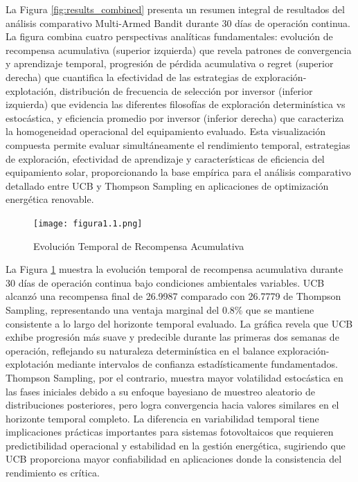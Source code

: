 \documentclass[conference]{IEEEtran}
\begin{document}
La Figura \ref{fig:results_combined} presenta un resumen integral de resultados del análisis comparativo Multi-Armed Bandit durante 30 días de operación continua. La figura combina cuatro perspectivas analíticas fundamentales: evolución de recompensa acumulativa (superior izquierda) que revela patrones de convergencia y aprendizaje temporal, progresión de pérdida acumulativa o regret (superior derecha) que cuantifica la efectividad de las estrategias de exploración-explotación, distribución de frecuencia de selección por inversor (inferior izquierda) que evidencia las diferentes filosofías de exploración determinística vs estocástica, y eficiencia promedio por inversor (inferior derecha) que caracteriza la homogeneidad operacional del equipamiento evaluado. Esta visualización compuesta permite evaluar simultáneamente el rendimiento temporal, estrategias de exploración, efectividad de aprendizaje y características de eficiencia del equipamiento solar, proporcionando la base empírica para el análisis comparativo detallado entre UCB y Thompson Sampling en aplicaciones de optimización energética renovable.

\begin{figure}[H]
\centering
\texttt{[image: figura1.1.png]}
\caption{Evolución Temporal de Recompensa Acumulativa}
\label{fig:1.1}
\end{figure}

La Figura \ref{fig:1.1} muestra la evolución temporal de recompensa acumulativa durante 30 días de operación continua bajo condiciones ambientales variables. UCB alcanzó una recompensa final de 26.9987 comparado con 26.7779 de Thompson Sampling, representando una ventaja marginal del 0.8\% que se mantiene consistente a lo largo del horizonte temporal evaluado. La gráfica revela que UCB exhibe progresión más suave y predecible durante las primeras dos semanas de operación, reflejando su naturaleza determinística en el balance exploración-explotación mediante intervalos de confianza estadísticamente fundamentados. Thompson Sampling, por el contrario, muestra mayor volatilidad estocástica en las fases iniciales debido a su enfoque bayesiano de muestreo aleatorio de distribuciones posteriores, pero logra convergencia hacia valores similares en el horizonte temporal completo. La diferencia en variabilidad temporal tiene implicaciones prácticas importantes para sistemas fotovoltaicos que requieren predictibilidad operacional y estabilidad en la gestión energética, sugiriendo que UCB proporciona mayor confiabilidad en aplicaciones donde la consistencia del rendimiento es crítica.
\end{document}
